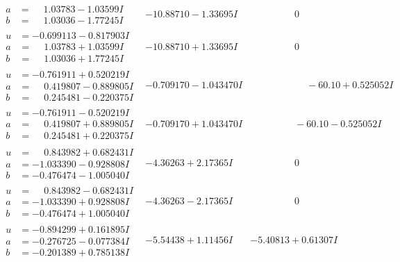 \documentclass[1p]{elsarticle_modified}
\theoremstyle{definition}
\begin{document}
$$\begin{array}{c|c|c}
\begin{aligned}
a &= \phantom{-}1.03783 - 1.03599 I \\
b &= \phantom{-}1.03036 - 1.77245 I\end{aligned}
 & -10.88710 - 1.33695 I & \phantom{-0.000000 } 0 \\ \hline\begin{aligned}
u &= -0.699113 - 0.817903 I \\
a &= \phantom{-}1.03783 + 1.03599 I \\
b &= \phantom{-}1.03036 + 1.77245 I\end{aligned}
 & -10.88710 + 1.33695 I & \phantom{-0.000000 } 0 \\ \hline\begin{aligned}
u &= -0.761911 + 0.520219 I \\
a &= \phantom{-}0.419807 - 0.889805 I \\
b &= \phantom{-}0.245481 - 0.220375 I\end{aligned}
 & -0.709170 - 1.043470 I & \phantom{-0.000000 -}     -6
0. 10   + 0.525052 I \\ \hline\begin{aligned}
u &= -0.761911 - 0.520219 I \\
a &= \phantom{-}0.419807 + 0.889805 I \\
b &= \phantom{-}0.245481 + 0.220375 I\end{aligned}
 & -0.709170 + 1.043470 I & \phantom{-0.000000 }      -6
0. 10   - 0.525052 I \\ \hline\begin{aligned}
u &= \phantom{-}0.843982 + 0.682431 I \\
a &= -1.033390 - 0.928808 I \\
b &= -0.476474 - 1.005040 I\end{aligned}
 & -4.36263 + 2.17365 I & \phantom{-0.000000 } 0 \\ \hline\begin{aligned}
u &= \phantom{-}0.843982 - 0.682431 I \\
a &= -1.033390 + 0.928808 I \\
b &= -0.476474 + 1.005040 I\end{aligned}
 & -4.36263 - 2.17365 I & \phantom{-0.000000 } 0 \\ \hline\begin{aligned}
u &= -0.894299 + 0.161895 I \\
a &= -0.276725 - 0.077384 I \\
b &= -0.201389 + 0.785138 I\end{aligned}
 & -5.54438 + 1.11456 I & -5.40813 + 0.61307 I \\ \hline\begin{aligned}

\end{aligned}
\end{array}$$
\end{document}
